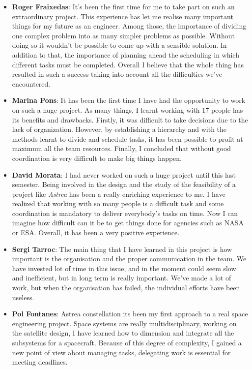 {\begin{itemize}
 
\item \textbf{Roger Fraixedas}: It's been the first time for me to take part on such an extraordinary project. This experience has let me realise many important things for my future as an engineer. Among those, the importance of dividing one complex problem into as many simpler problems as possible. Without doing so it wouldn't be possible to come up with a sensible solution. In addition to that, the importance of planning ahead the scheduling in which different tasks must be completed. Overall I believe that the whole thing has resulted in such a success taking into account all the difficulties we've encountered.

 
\item \textbf{Marina Pons}: It has been the first time I have had the opportunity to work on such a huge project. As many things, I learnt working with 17 people has its benefits and drawbacks. Firstly, it was difficult to take decisions due to the lack of organization. However, by establishing a hierarchy and with the methods learnt to divide and schedule tasks, it has been possible to profit at maximum all the team resources. Finally, I concluded that without good coordination is very difficult to make big things happen.

 
\item \textbf{David Morata}: I had never worked on such a huge project until this last semester. Being involved in the design and the study of the feasibility of a project like \textit{Astrea} has been a really enriching experience to me. I have realized that working with so many people is a difficult task and some coordination is mandatory to deliver everybody's tasks on time. Now I can imagine how difficult can it be to get things done for agencies such as NASA or ESA. Overall, it has been a very positive experience.

\item \textbf{Sergi Tarroc}: The main thing that I have learned in this project is how important is the organisation and the proper communication in the team. We have invested lot of time in this issue, and in the moment could seem slow and inefficient, but in long term is really important. We've made a lot of work, but when the organisation has failed, the individual efforts have been useless.
 
\item \textbf{Pol Fontanes}: Astrea constellation  its been my first approach to a real space engineering project. Space systems are really multidisciplinary, working on the satellite design, I have learned how to dimension and integrate all the subsystems for a spacecraft. Because of this degree of complexity, I gained a new point of view about managing tasks, delegating work is essential for meeting deadlines.


\end{itemize}}
